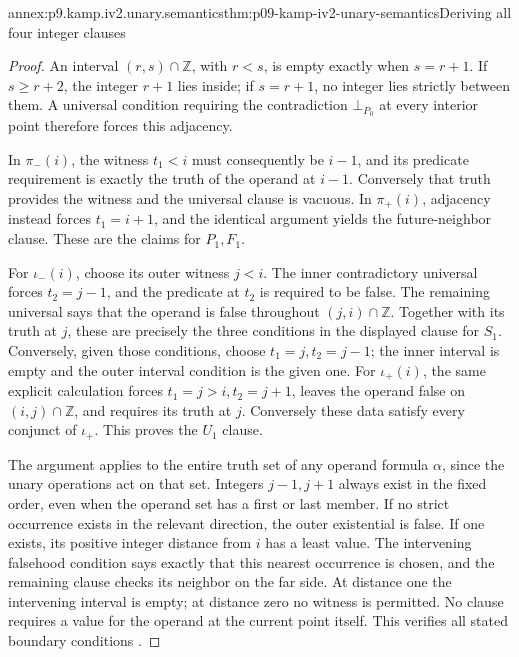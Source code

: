\begin{annexitem}{annex:p9.kamp.iv2.unary.semantics}{thm:p09-kamp-iv2-unary-semantics}{Deriving all four integer clauses}
\begin{proof}
An interval \((r,s)\cap\mathbb Z\), with \(r<s\),
is empty exactly when \(s=r+1\). If \(s\geq r+2\),
the integer \(r+1\) lies inside; if \(s=r+1\), no
integer lies strictly between them. A universal condition
requiring the contradiction \(\bot_{P_0}\) at every
interior point therefore forces this adjacency.

In \(\pi_-(i)\), the witness \(t_1<i\) must consequently
be \(i-1\), and its predicate requirement is exactly the
truth of the operand at \(i-1\). Conversely that truth
provides the witness and the universal clause is vacuous.
In \(\pi_+(i)\), adjacency instead forces \(t_1=i+1\),
and the identical argument yields the future-neighbor clause.
These are the claims for \(P_1,F_1\).

For \(\iota_-(i)\), choose its outer witness \(j<i\).
The inner contradictory universal forces \(t_2=j-1\),
and the predicate at \(t_2\) is required to be false.
The remaining universal says that the operand is false
throughout \((j,i)\cap\mathbb Z\). Together with its
truth at \(j\), these are precisely the three conditions
in the displayed clause for \(S_1\). Conversely, given
those conditions, choose \(t_1=j,t_2=j-1\); the inner
interval is empty and the outer interval condition is the
given one. For \(\iota_+(i)\), the same explicit
calculation forces \(t_1=j>i,t_2=j+1\), leaves the
operand false on \((i,j)\cap\mathbb Z\), and requires
its truth at \(j\). Conversely these data satisfy every
conjunct of \(\iota_+\). This proves the \(U_1\) clause.

The argument applies to the entire truth set of any operand
formula \(\alpha\), since the unary operations act on
that set. Integers \(j-1,j+1\) always exist in the fixed
order, even when the operand set has a first or last member.
If no strict occurrence exists in the relevant direction,
the outer existential is false. If one exists, its positive
integer distance from \(i\) has a least value. The
intervening falsehood condition says exactly that this nearest
occurrence is chosen, and the remaining clause checks its
neighbor on the far side. At distance one the intervening
interval is empty; at distance zero no witness is permitted.
No clause requires a value for the operand at the current
point itself. This verifies all stated boundary conditions
\cite[ch.~IV, def.~2, p.~100 and pp.~101--102]{Kamp1968}.
\end{proof}
\end{annexitem}

